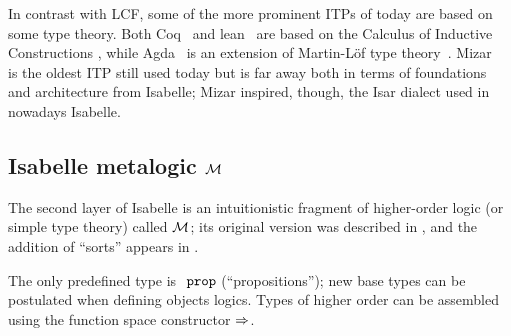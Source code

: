 In contrast with LCF, some of the more prominent ITPs of today are
based on some type theory. Both Coq~\cite{coq} and
lean~\cite{DBLP:conf/cade/Moura021} are based on the Calculus of
Inductive Constructions
\cite{DBLP:conf/mfps/PfenningP89,DBLP:journals/iandc/CoquandH88},
while Agda~\cite{agda} is an extension of Martin-Löf type
theory~\cite{DBLP:books/daglib/0000395}. Mizar~\cite{mizar} is the
oldest ITP still used today but is far away both in terms of
foundations and architecture from Isabelle; Mizar inspired, though, the
Isar dialect used in nowadays Isabelle.




\subsection{Isabelle metalogic $\mathcal{M}$}
\label{sec:isabelle-metalogic-meta}

The second layer of Isabelle is an
intuitionistic fragment of higher-order logic (or simple type theory)
called $\mathcal{M}$; its original version was described in \cite{Paulson1989},
and the addition of “sorts” appears in \cite{Nipkow-LF-91}.

The only predefined type is $\prop$ (“propositions”); new base types
can be postulated when defining objects logics. Types of higher order can be
assembled using the function space constructor $\Rightarrow$.

